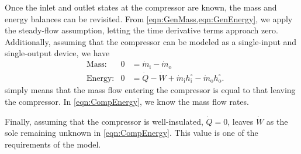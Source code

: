 Once the inlet and outlet states at the compressor are known, 
the mass and energy balances can be revisited. 
From \cref{eqn:GenMass,eqn:GenEnergy}, we apply the steady-flow assumption, 
letting the time derivative terms approach zero. 
Additionally, assuming that the compressor can be modeled as a 
single-input and single-output device, we have
\begin{align}
  &\text{Mass:}   & 0 &= {\dot{m}_{\text{i}}} - {\dot{m}_{\text{o}}} \label{eqn:CompMass}\\
  &\text{Energy:} & 0 &= \dot{Q} - \dot{W} + {\dot{m}_{\text{i}}h^{\circ}_{\text{i}}} - 
		{\dot{m}_{\text{o}}h^{\circ}_{\text{o}}} \label{eqn:CompEnergy}.
\end{align}
 simply means that the mass flow 
entering the compressor is equal to that leaving the compressor. 
In \cref{eqn:CompEnergy}, we know the mass flow rates. 

Finally, assuming that the compressor is well-insulated, 
\ie{} $\dot{Q}=0$, leaves $\dot{W}$ 
as the sole remaining unknown in \cref{eqn:CompEnergy}. 
This value is one of the requirements of the model. 

